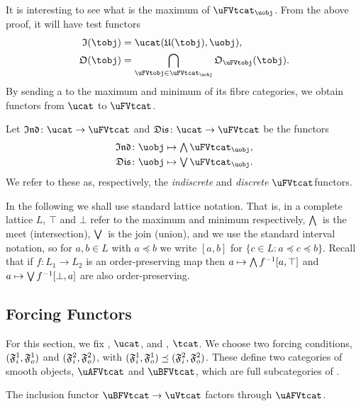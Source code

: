 \documentclass[%
12pt,%
arxiv,%
defaults
]{myclass}
\begin{document}
It is interesting to see what is the maximum of \(\uFVtcat_{\uobj}\).
From the above proof, it will have test functors
%
\begin{align*}
\itest(\tobj) &= \Hom{\ucat}{\ufunc(\tobj)}{\uobj}, \\
%
\otest(\tobj) &= \bigcap_{\uFVtobj \in \uFVtcat_{\uobj}} \otest_{\uFVtobj}(\tobj).
\end{align*}
%
By sending a \uobj to the maximum and minimum of its fibre categories, we obtain functors from \(\ucat\) to \(\uFVtcat\).

\begin{defn}
Let \(\indfunc \colon \ucat \to \uFVtcat\) and \(\disfunc \colon \ucat \to \uFVtcat\) be the functors
%
\begin{align*}
\indfunc \colon \uobj &\mapsto \meet \uFVtcat_{\uobj}, \\
%
\disfunc \colon \uobj &\mapsto \join \uFVtcat_{\uobj}.
\end{align*}
%
We refer to these as, respectively, the \emph{indiscrete} and \emph{discrete} \(\uFVtcat\)\enhyp{}functors.
\end{defn}


In the following we shall use standard lattice notation.
That is, in a complete lattice \(L\), \(\top\) and \(\bot\) refer to the maximum and minimum respectively, \({\textstyle\bigwedge}\,\) is the meet (intersection), \({\textstyle\bigvee}\,\) is the join (union), and we use the standard interval notation, so for \(a, b \in L\) with \(a \preceq b\) we  write \([a,b]\) for \(\{c \in L : a \preceq c \preceq b\}\).
Recall that if \(f \colon L_1 \to L_2\) is an order\hyp{}preserving map then \(a \mapsto {\textstyle\bigwedge}\, f^{-1}[a, \top]\) and \(a \mapsto {\textstyle\bigvee}\, f^{-1}[\bot, a]\) are also order\hyp{}preserving. 

\subsection{Forcing Functors}
\label{sec:force}

For this section, we fix \ucat, \(\ucat\), and \tcat, \(\tcat\).
We choose two forcing conditions, \((\iforce^1, \oforce^1)\) and \((\iforce^2, \oforce^2)\), with \((\iforce^1, \oforce^1) \preceq (\iforce^2, \oforce^2)\).
These define two categories of smooth objects, \(\uAFVtcat\) and \(\uBFVtcat\), which are full subcategories of \uVtcat.

\begin{proposition}
The inclusion functor \(\uBFVtcat \to \uVtcat\) factors through \(\uAFVtcat\).
\end{proposition}
\end{document}
